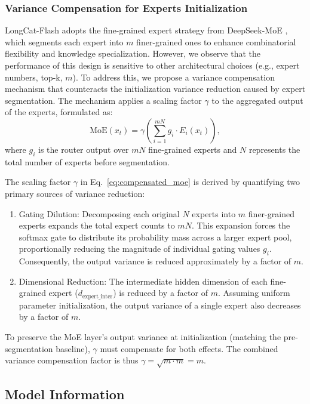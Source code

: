 \documentclass{article}
\newcommand{\longcat}{LongCat-Flash\xspace}
\begin{document}
\subsubsection{Variance Compensation for Experts Initialization}
\longcat adopts the fine-grained expert strategy from DeepSeek-MoE \citep{liu2024deepseek}, which segments each expert into $m$ finer-grained ones to enhance combinatorial flexibility and knowledge specialization. However, we observe that the performance of this design is sensitive to other architectural choices (e.g., expert numbers, top-k, $m$). To address this, we propose a variance compensation mechanism that counteracts the initialization variance reduction caused by expert segmentation. The mechanism applies a scaling factor $\gamma$ to the aggregated output of the experts, formulated as:
\begin{equation}
    \text{MoE}(x_t) = \gamma \left( \sum_{i=1}^{mN} g_i \cdot E_i(x_t) \right),
    \label{eq:compensated_moe}
\end{equation}
where $g_i$ is the router output over $mN$ fine-grained experts and $N$ represents the total number of experts before segmentation.




The scaling factor $\gamma$ in Eq.~\eqref{eq:compensated_moe} is derived by quantifying two primary sources of variance reduction:
\begin{enumerate}
    \item Gating Dilution: Decomposing each original $N$ experts into $m$ finer-grained experts expands the total expert counts to $mN$. This expansion forces the softmax gate to distribute its probability mass across a larger expert pool, proportionally reducing the magnitude of individual gating values $g_i$. Consequently, the output variance is reduced approximately by a factor of $m$.
    \item Dimensional Reduction: The intermediate hidden dimension of each fine-grained expert ($d_{\text{expert\_inter}}$) is reduced by a factor of $m$. Assuming uniform parameter initialization, the output variance of a single expert also decreases by a factor of $m$.
\end{enumerate}

To preserve the MoE layer’s output variance at initialization (matching the pre-segmentation baseline), $\gamma$ must compensate for both effects. The combined variance compensation factor is thus $\gamma = \sqrt{m \cdot m}= m$.


\subsection{Model Information}
\end{document}
